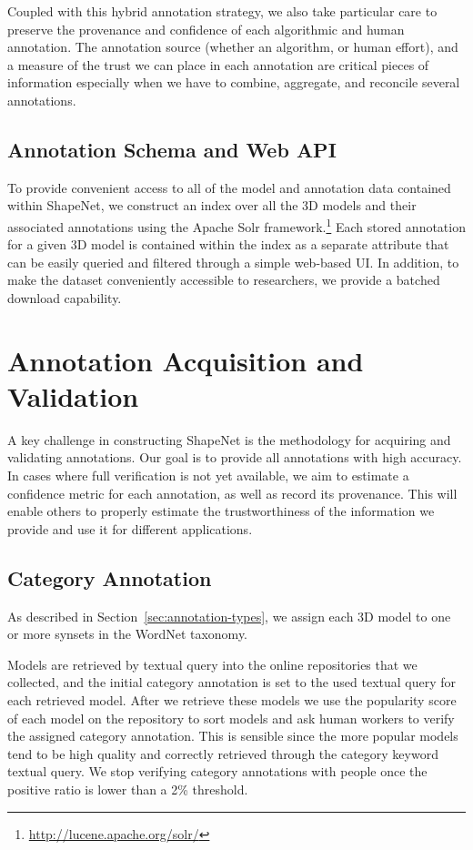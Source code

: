 Coupled with this hybrid annotation strategy, we also take particular care to preserve the provenance and confidence of each algorithmic and human annotation.  The annotation source (whether an algorithm, or human effort), and a measure of the trust we can place in each annotation are critical pieces of information especially when we have to combine, aggregate, and reconcile several annotations.

\subsection{Annotation Schema and Web API}

To provide convenient access to all of the model and annotation data contained within ShapeNet, we construct an index over all the 3D models and their associated annotations using the Apache Solr framework.\footnote{\url{http://lucene.apache.org/solr/}}  Each stored annotation for a given 3D model is contained within the index as a separate attribute that can be easily queried and filtered through a simple web-based UI.  In addition, to make the dataset conveniently accessible to researchers, we provide a batched download capability.

\section{Annotation Acquisition and Validation}
\label{sec:acquisition}
A key challenge in constructing ShapeNet is the methodology for acquiring and validating annotations. Our goal is to provide all annotations with high accuracy. In cases where full verification is not yet available, we aim to estimate a confidence metric for each annotation, as well as record its provenance. This will enable others to properly estimate the trustworthiness of the information we provide and use it for different applications.

\subsection{Category Annotation}
\label{sec:acquisition:categoryannotation}
As described in Section~\ref{sec:annotation-types}, we assign each 3D model to one or more synsets in the WordNet taxonomy.

Models are retrieved by textual query into the online repositories that we collected, and the initial category annotation is set to the used textual query for each retrieved model.  After we retrieve these models we use the popularity score of each model on the repository to sort models and ask human workers to verify the assigned category annotation.  This is sensible since the more popular models tend to be high quality and correctly retrieved through the category keyword textual query.  We stop verifying category annotations with people once the positive ratio is lower than a 2\% threshold.

